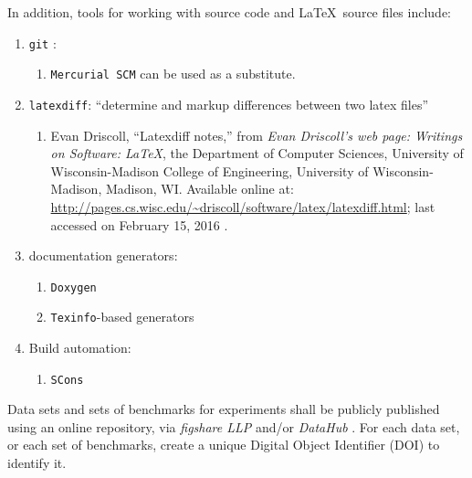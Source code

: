\documentclass[letter,12pt]{article}
\begin{document}
In addition, tools for working with source code and \LaTeX\ source files include: \vspace{-0.3cm}
\begin{enumerate} \itemsep -4pt
\item {\tt git} \cite{Hamano2014,Driscoll2012}: \vspace{-0.3cm}
	\begin{enumerate} \itemsep -2pt
	\item {\tt Mercurial SCM} \cite{MercurialContributors20XY,MercurialContributors20XYa,MercurialContributors2019,MercurialContributors2013,MercurialContributors2013a,DeMare2015,OSullivan2009,AtlassianStaff2018a} can be used as a substitute.
	\end{enumerate}
\item {\tt latexdiff}: ``determine and markup differences between two latex files'' \vspace{-0.3cm}
	\begin{enumerate} \itemsep -2pt
	\item Evan Driscoll, ``Latexdiff notes,'' from {\it Evan Driscoll's web page: Writings on Software: \LaTeX}, the Department of Computer Sciences, University of Wisconsin-Madison College of Engineering, University of Wisconsin-Madison, Madison, WI. Available online at: \url{http://pages.cs.wisc.edu/~driscoll/software/latex/latexdiff.html}; last accessed on February 15, 2016 \cite{Driscoll20XYb}.
	\end{enumerate}
\item documentation generators: \vspace{-0.3cm}
	\begin{enumerate} \itemsep -2pt
	\item {\tt Doxygen} \cite{vanHeesch2016}
	\item {\tt Texinfo}-based generators \cite{WikipediaContributors2016h,Stallman2016,Stallman2016a,Stallman2016b}
	\end{enumerate}
\item Build automation: \vspace{-0.3cm}
	\begin{enumerate} \itemsep -2pt
	\item {\tt SCons} \cite{Driscoll20XY}
	\end{enumerate}
\end{enumerate}


Data sets and sets of benchmarks for experiments shall be publicly published using an online repository, via {\it figshare LLP} \cite{figshareLLPstaff2016} and/or {\it DataHub} \cite{DatopianAtomaticLtdIncStaff2017}. For each data set, or each set of benchmarks, create a unique Digital Object Identifier (DOI) \cite{InternationalDOIFoundationStaff2017} to identify it. \\
\end{document}
